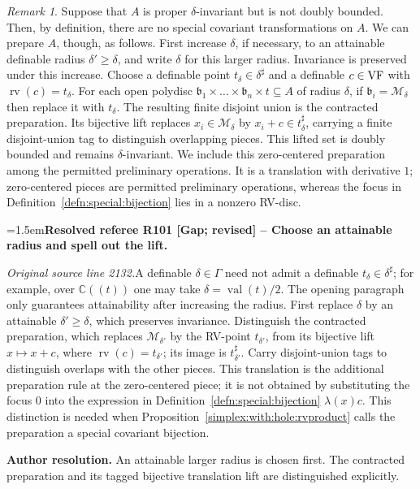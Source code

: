 \documentclass[12pt]{amsart}
\newcommand{\ResolvedRefereeRemark}[5]{%
  \par\medskip\begingroup\normalfont\small\color{gray}%
  \emergencystretch=1.5em\noindent\textbf{Resolved referee R#1 [#2] -- #3.}\par\nobreak\noindent #4\par
  \medskip\color{ResolutionGreen}\noindent\textbf{Author resolution.} #5\par
  \endgroup\medskip
}
\theoremstyle{plain}
\theoremstyle{definition}
\theoremstyle{remark}
\newtheorem{rem}[thm]{Remark}
\numberwithin{equation}{section}
\theoremstyle{plain}
\newcommand{\VF}{\textup{VF}}
\newcommand{\MM}{\mdl M}
\newcommand{\C}{\mathds{C}}
\newcommand{\gb}{\mathfrak{b}}
\newcommand{\0}{\emptyset}
\newcommand{\mdl}[1]{\mathcal{#1}}  %
\newcommand{\sub}{\subseteq}
\DeclareMathOperator{\rv}{rv}
\DeclareMathOperator{\vv}{val}
\begin{document}
\begin{rem}\label{spec:addendum}
Suppose that $A$ is proper $\delta$-invariant but is not doubly bounded. Then, by definition, there  are no special covariant transformations on $A$. We can prepare $A$, though, as follows. First increase $\delta$, if necessary, to an attainable definable radius $\delta'\geq\delta$, and write $\delta$ for this larger radius. Invariance is preserved under this increase. Choose a definable point $t_\delta\in\delta^\sharp$ and a definable $c\in\VF$ with $\rv(c)=t_\delta$. For each open polydisc $\gb_1 \times \ldots \times \gb_n \times t \sub A$ of radius $\delta$, if $\gb_i= \MM_\delta$ then replace it with $t_\delta$. The resulting finite disjoint union is the contracted preparation. Its bijective lift replaces $x_i\in\MM_\delta$ by $x_i+c\in t_\delta^\sharp$, carrying a finite disjoint-union tag to distinguish overlapping pieces. This lifted set is doubly bounded and remains $\delta$-invariant. We include this zero-centered preparation among the permitted preliminary operations. It is a translation with derivative $1$; zero-centered pieces are permitted preliminary operations, whereas the focus in Definition~\ref{defn:special:bijection} lies in a nonzero RV-disc.
\end{rem}

\ResolvedRefereeRemark{101}{Gap; revised}{Choose an attainable radius and spell out the lift}{%
\textit{Original source line 2132.}\quad A definable $\delta\in\Gamma$ need not admit a definable $t_\delta\in\delta^\sharp$; for example, over $\C((t))$ one may take $\delta=\vv(t)/2$. The opening paragraph only guarantees attainability after increasing the radius. First replace $\delta$ by an attainable $\delta'\geq\delta$, which preserves invariance. Distinguish the contracted preparation, which replaces $\MM_{\delta'}$ by the RV-point $t_{\delta'}$, from its bijective lift $x\mapsto x+c$, where $\rv(c)=t_{\delta'}$; its image is $t_{\delta'}^\sharp$. Carry disjoint-union tags to distinguish overlaps with the other pieces. This translation is the additional preparation rule at the zero-centered piece; it is not obtained by substituting the focus $0$ into the expression in Definition~\ref{defn:special:bijection} $\lambda(x)c$. This distinction is needed when Proposition~\ref{simplex:with:hole:rvproduct} calls the preparation a special covariant bijection.
}{An attainable larger radius is chosen first. The contracted preparation and its tagged bijective translation lift are distinguished explicitly.}
\end{document}
